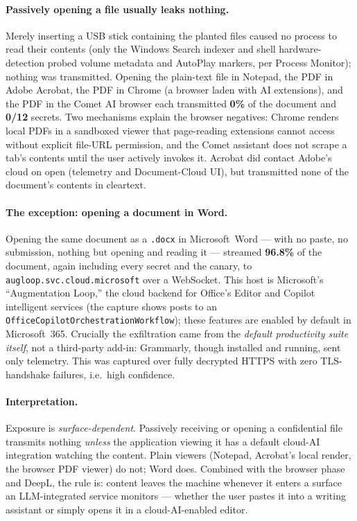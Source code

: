 \paragraph{Passively opening a file usually leaks nothing.} Merely inserting a
USB stick containing the planted files caused no process to read their contents
(only the Windows Search indexer and shell hardware-detection probed volume
metadata and AutoPlay markers, per Process Monitor); nothing was transmitted.
Opening the plain-text file in Notepad, the PDF in Adobe Acrobat, the PDF in
Chrome (a browser laden with AI extensions), and the PDF in the Comet AI browser
each transmitted \textbf{0\%} of the document and \textbf{0/12} secrets. Two
mechanisms explain the browser negatives: Chrome renders local PDFs in a
sandboxed viewer that page-reading extensions cannot access without explicit
file-URL permission, and the Comet assistant does not scrape a tab's contents
until the user actively invokes it. Acrobat did contact Adobe's cloud on open
(telemetry and Document-Cloud UI), but transmitted none of the document's
contents in cleartext.

\paragraph{The exception: opening a document in Word.} Opening the same document
as a \texttt{.docx} in Microsoft~Word --- with no paste, no submission, nothing
but opening and reading it --- streamed \textbf{96.8\%} of the document, again
including every secret and the canary, to \texttt{augloop.svc.cloud.microsoft}
over a WebSocket. This host is Microsoft's ``Augmentation Loop,'' the cloud
backend for Office's Editor and Copilot intelligent services (the capture shows
posts to an \texttt{OfficeCopilotOrchestrationWorkflow}); these features are
enabled by default in Microsoft~365. Crucially the exfiltration came from the
\emph{default productivity suite itself}, not a third-party add-in: Grammarly,
though installed and running, sent only telemetry. This was captured over fully
decrypted HTTPS with zero TLS-handshake failures, i.e.\ high confidence.

\paragraph{Interpretation.} Exposure is \emph{surface-dependent}. Passively
receiving or opening a confidential file transmits nothing \emph{unless} the
application viewing it has a default cloud-AI integration watching the content.
Plain viewers (Notepad, Acrobat's local render, the browser PDF viewer) do not;
Word does. Combined with the browser phase and DeepL, the rule is: content
leaves the machine whenever it enters a surface an LLM-integrated service
monitors --- whether the user pastes it into a writing assistant or simply opens
it in a cloud-AI-enabled editor.

